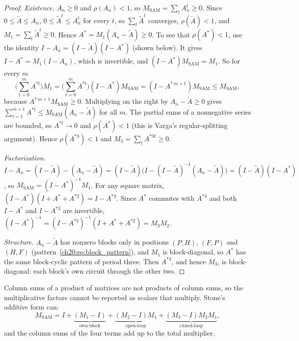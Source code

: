 \documentclass[../structural_economics_book.tex]{subfiles}
\begin{document}
\begin{proof}
\emph{Existence.} $A_n \ge 0$ and $\rho(A_n) < 1$, so $M_{\text{SAM}} = \sum_t A_n^t \ge 0$. Since $0 \le \tilde A \le A_n$, $0 \le \tilde A^t \le A_n^t$ for every $t$, so $\sum_t \tilde A^t$ converges, $\rho(\tilde A) < 1$, and $M_1 = \sum_t \tilde A^t \ge 0$. Hence $A^* = M_1(A_n - \tilde A) \ge 0$. To see that $\rho(A^*) < 1$, use the identity $I - A_n = (I - \tilde A)(I - A^*)$ (shown below). It gives $I - A^* = M_1(I - A_n)$, which is invertible, and $(I - A^*)M_{\text{SAM}} = M_1$. So for every $m$
\[
\Big(\sum_{t=0}^{m}A^{*t}\Big)M_1 = \Big(\sum_{t=0}^{m}A^{*t}\Big)(I - A^*)M_{\text{SAM}} = (I - A^{*\,m+1})M_{\text{SAM}} \le M_{\text{SAM}},
\]
because $A^{*\,m+1}M_{\text{SAM}} \ge 0$. Multiplying on the right by $A_n - \tilde A \ge 0$ gives $\sum_{t=1}^{m+1}A^{*t} \le M_{\text{SAM}}(A_n - \tilde A)$ for all $m$. The partial sums of a nonnegative series are bounded, so $A^{*t} \to 0$ and $\rho(A^*) < 1$ (this is Varga's regular-splitting argument). Hence $\rho(A^{*3}) < 1$ and $M_3 = \sum_t A^{*3t} \ge 0$.

\emph{Factorization.} $I - A_n = (I - \tilde A) - (A_n - \tilde A) = (I - \tilde A)\big(I - (I - \tilde A)^{-1}(A_n - \tilde A)\big) = (I - \tilde A)(I - A^*)$, so $M_{\text{SAM}} = (I - A^*)^{-1}M_1$. For any square matrix, $(I - A^*)(I + A^* + A^{*2}) = I - A^{*3}$. Since $A^*$ commutes with $A^{*3}$ and both $I - A^*$ and $I - A^{*3}$ are invertible, $(I - A^*)^{-1} = (I - A^{*3})^{-1}(I + A^* + A^{*2}) = M_3 M_2$.

\emph{Structure.} $A_n - \tilde A$ has nonzero blocks only in positions $(P,H)$, $(F,P)$ and $(H,F)$ (pattern~\eqref{ch20:eq:block_pattern}), and $M_1$ is block-diagonal, so $A^*$ has the same block-cyclic pattern of period three. Then $A^{*3}$, and hence $M_3$, is block-diagonal: each block's own circuit through the other two.
\end{proof}

\begin{remark}
Column sums of a product of matrices are not products of column sums, so the multiplicative factors cannot be reported as scalars that multiply. Stone's additive form can:
\[
M_{\text{SAM}} = I + \underbrace{(M_1 - I)}_{\text{own-block}} + \underbrace{(M_2 - I)M_1}_{\text{open-loop}} + \underbrace{(M_3 - I)M_2 M_1}_{\text{closed-loop}},
\]
and the column sums of the four terms add up to the total multiplier.
\end{remark}
\end{document}
